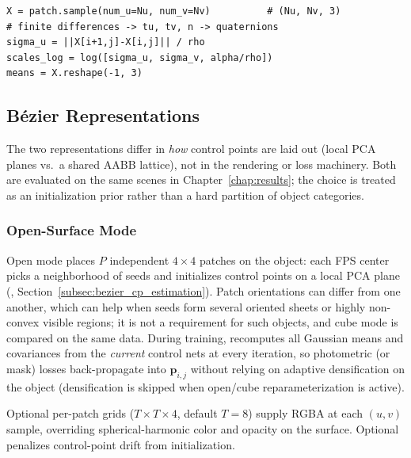 \begin{lstlisting}[caption={Open-mode sampling and Gaussian frames (\filepath{splatfacto.py}, simplified).},label={lst:bezier_sample}]
X = patch.sample(num_u=Nu, num_v=Nv)          # (Nu, Nv, 3)
# finite differences -> tu, tv, n -> quaternions
sigma_u = ||X[i+1,j]-X[i,j]|| / rho
scales_log = log([sigma_u, sigma_v, alpha/rho])
means = X.reshape(-1, 3)
\end{lstlisting}

\subsection{B\'ezier Representations}
\label{subsec:bezier_representations}

The two representations differ in \emph{how} control points are laid out (local PCA planes vs.\ a shared AABB lattice), not in the rendering or loss machinery. Both are evaluated on the same scenes in Chapter~\ref{chap:results}; the choice is treated as an initialization prior rather than a hard partition of object categories.

\subsubsection{Open-Surface Mode}
\label{subsec:bezier_open}

Open mode places $P$ independent $4\times 4$ patches on the object: each FPS center picks a neighborhood of seeds and initializes control points on a local PCA plane (, Section~\ref{subsec:bezier_cp_estimation}). Patch orientations can differ from one another, which can help when seeds form several oriented sheets or highly non-convex visible regions; it is not a requirement for such objects, and cube mode is compared on the same data. During training,  recomputes all Gaussian means and covariances from the \emph{current} control nets at every iteration, so photometric (or mask) losses back-propagate into $\mathbf{p}_{i,j}$ without relying on adaptive densification on the object (densification is skipped when open/cube reparameterization is active).

Optional per-patch  grids ($T\times T\times 4$, default $T=8$) supply RGBA at each $(u,v)$ sample, overriding spherical-harmonic color and opacity on the surface. Optional  penalizes control-point drift from initialization.

